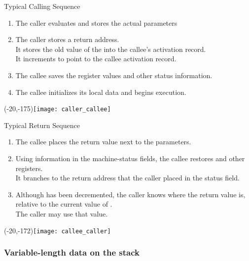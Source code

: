 \begin{bibunit}[apalike]
\begin{frame}{Typical Calling Sequence}
	\begin{enumerate}
	\item The caller evaluates and stores the actual parameters
	\item The caller stores a return address. \\
		It stores the old value of the  into the callee's activation record. \\
		It increments  to point to the callee activation record.
	\item The callee saves the register values and other status information.
	\item The callee initializes its local data and begins execution.
	\end{enumerate}
	\putat(-20,-175){\texttt{[image: caller\_callee]}}
\end{frame}

\begin{frame}{Typical Return Sequence}
	\begin{enumerate}
	\item The callee places the return value next to the parameters.
	\item Using information in the machine-status fields, the callee restores  and other registers. \\
		It branches to the return address that the caller placed in the status field.
	\item Although  has been decremented, the caller knows where the return value is, relative to the current value of . \\
		The caller may use that value.
	\end{enumerate}
	\putat(-20,-172){\texttt{[image: callee\_caller]}}
\end{frame}

\subsubsection{Variable-length data on the stack}

\tableofcontentslide[sections={1-4},sectionstyle={show/shaded},subsectionstyle={show/shaded/hide},subsubsectionstyle={show/shaded/hide/hide}]


\end{bibunit}
